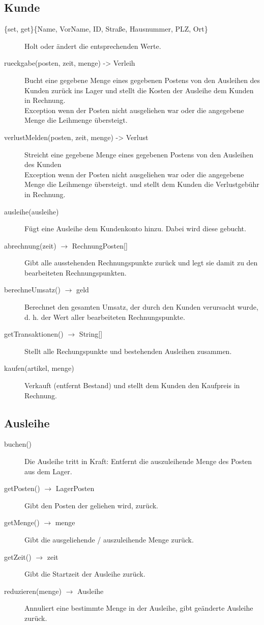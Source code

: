 \documentclass[a4paper,12pt,titlepage]{article}
\begin{document}
\subsection{Kunde}
\begin{description}
\item[\{set, get\}\{Name, VorName, ID, Straße, Hausnummer, PLZ, Ort\}]
Holt oder ändert die entsprechenden Werte.
\item[rueckgabe(posten, zeit, menge) -> Verleih]
Bucht eine gegebene Menge eines gegebenen Postens von den Ausleihen des Kunden zurück ins Lager
und stellt die Kosten der Ausleihe dem Kunden in Rechnung.\\
Exception wenn der Posten nicht ausgeliehen war oder die angegebene Menge die Leihmenge übersteigt.
\item[verlustMelden(posten, zeit, menge) -> Verlust]
Streicht eine gegebene Menge eines gegebenen Postens von den Ausleihen des Kunden\\
Exception wenn der Posten nicht ausgeliehen war oder die angegebene Menge die Leihmenge übersteigt.
und stellt dem Kunden die Verlustgebühr in Rechnung.
\item[ausleihe(ausleihe)]
Fügt eine Ausleihe dem Kundenkonto hinzu. Dabei wird diese gebucht.
\item[abrechnung(zeit) $\rightarrow$ RechnungPosten{[]}]
Gibt alle ausstehenden Rechnungspunkte zurück und legt sie damit zu den bearbeiteten Rechnungspunkten.
\item[berechneUmsatz() $\rightarrow$ geld]
Berechnet den gesamten Umsatz, der durch den Kunden verursacht wurde, d. h. der Wert aller bearbeiteten Rechnungspunkte.
\item[getTransaktionen() $\rightarrow$ String{[]}]
Stellt alle Rechungspunkte und bestehenden Ausleihen zusammen.
\item[kaufen(artikel, menge)]
Verkauft (entfernt Bestand) und stellt dem Kunden den Kaufpreis in Rechnung.
\end{description}
\subsection{Ausleihe}
\begin{description}
\item[buchen()]
Die Ausleihe tritt in Kraft: Entfernt die auszuleihende Menge des Posten aus dem Lager.
\item[getPosten() $\rightarrow$ LagerPosten]
Gibt den Posten der geliehen wird, zurück.
\item[getMenge() $\rightarrow$ menge]
Gibt die ausgeliehende / auszuleihende Menge zurück.
\item[getZeit() $\rightarrow$ zeit]
Gibt die Startzeit der Ausleihe zurück.
\item[reduzieren(menge) $\rightarrow$ Ausleihe]
Annuliert eine bestimmte Menge in der Ausleihe, gibt geänderte Ausleihe zurück.
\end{description}
\end{document}
